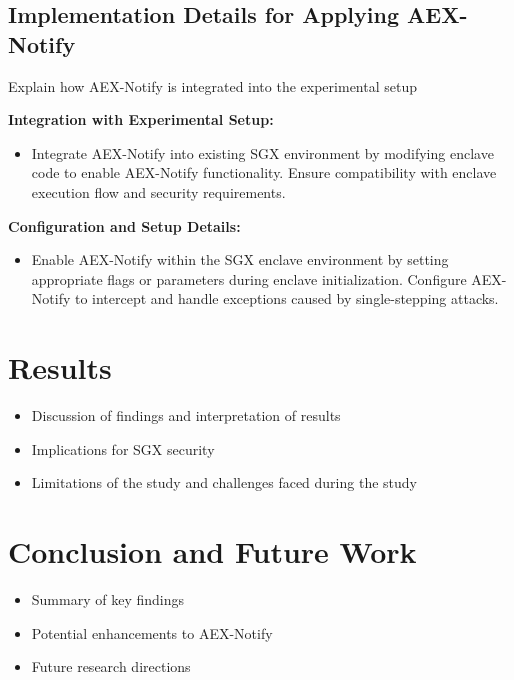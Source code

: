 \documentclass{llncs}
\begin{document}
\subsection{Implementation Details for Applying AEX-Notify}

Explain how AEX-Notify is integrated into the experimental setup

\textbf{Integration with Experimental Setup:}
\begin{itemize}
  \item Integrate AEX-Notify into existing SGX environment by modifying enclave code to enable AEX-Notify functionality. Ensure compatibility with enclave execution flow and security requirements.
\end{itemize}

\textbf{Configuration and Setup Details:}
\begin{itemize}
  \item Enable AEX-Notify within the SGX enclave environment by setting appropriate flags or parameters during enclave initialization. Configure AEX-Notify to intercept and handle exceptions caused by single-stepping attacks.
\end{itemize}

\section{Results}
\begin{itemize}
  \item Discussion of findings and interpretation of results
  \item Implications for SGX security
  \item Limitations of the study and challenges faced during the study
\end{itemize}

\section{Conclusion and Future Work}
\begin{itemize}
    \item Summary of key findings
    \item Potential enhancements to AEX-Notify
    \item Future research directions
\end{itemize}


%

\end{document}
